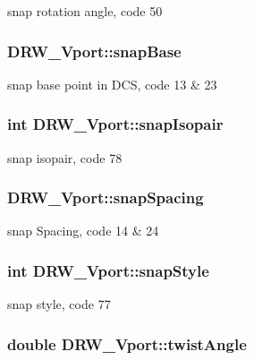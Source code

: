 snap rotation angle, code 50 \hypertarget{classDRW__Vport_a152be2cc28b499c29e9302efa54e001c}{
\subsubsection[{snap\-Base}]{ D\-R\-W\-\_\-\-Vport\-::snap\-Base}}\label{classDRW__Vport_a152be2cc28b499c29e9302efa54e001c}
snap base point in D\-C\-S, code 13 \& 23 \hypertarget{classDRW__Vport_ab69959b8dfaf2ce024b4babee4466445}{
\subsubsection[{snap\-Isopair}]{\setlength{\rightskip}{0pt plus 5cm}int D\-R\-W\-\_\-\-Vport\-::snap\-Isopair}}\label{classDRW__Vport_ab69959b8dfaf2ce024b4babee4466445}
snap isopair, code 78 \hypertarget{classDRW__Vport_a19aa53d1282cb737b21fa3d3b60d3b20}{
\subsubsection[{snap\-Spacing}]{ D\-R\-W\-\_\-\-Vport\-::snap\-Spacing}}\label{classDRW__Vport_a19aa53d1282cb737b21fa3d3b60d3b20}
snap Spacing, code 14 \& 24 \hypertarget{classDRW__Vport_a09eede75fea3bb3052edfc9caf5fd380}{
\subsubsection[{snap\-Style}]{\setlength{\rightskip}{0pt plus 5cm}int D\-R\-W\-\_\-\-Vport\-::snap\-Style}}\label{classDRW__Vport_a09eede75fea3bb3052edfc9caf5fd380}
snap style, code 77 \hypertarget{classDRW__Vport_a2705ee0b61e21b33cad269b71c04b86c}{
\subsubsection[{twist\-Angle}]{\setlength{\rightskip}{0pt plus 5cm}double D\-R\-W\-\_\-\-Vport\-::twist\-Angle}}\label{classDRW__Vport_a2705ee0b61e21b33cad269b71c04b86c}
